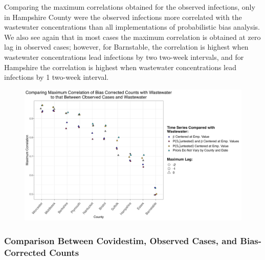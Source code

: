\documentclass[12pt,twoside]{smiththesis}
\begin{document}
Comparing the maximum correlations obtained for the observed infections, only in Hampshire County were the observed infections more correlated with the wastewater concentrations than all implementations of probabilistic bias analysis. We also see again that in most cases the maximum correlation is obtained at zero lag in observed cases; however, for Barnstable, the correlation is highest when wastewater concentrations lead infections by two two-week intervals, and for Hampshire the correlation is highest when wastewater concentrations lead infections by 1 two-week interval.
\begin{figure}
\includegraphics[width=1\linewidth]{figure/correlation_observed_pb} \caption{\label{fig:correlation_observed_pb}}\label{fig:unnamed-chunk-102}
\end{figure}
\hypertarget{comparison-between-covidestim-observed-cases-and-bias-corrected-counts}{%
\subsubsection{Comparison Between Covidestim, Observed Cases, and Bias-Corrected Counts}\label{comparison-between-covidestim-observed-cases-and-bias-corrected-counts}}
\end{document}
